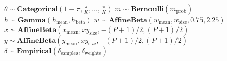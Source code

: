 \begin{algorithmic}[1]
        \State $\theta \sim \mathbf{Categorical}\left(1 - \pi, \frac{\pi}{K}, \dots, \frac{\pi}{K}\right)$
            \State $m \sim \mathbf{Bernoulli}(m_\mathrm{prob})$
            \State $h \sim \mathbf{Gamma}(h_\mathrm{mean}, h_\mathrm{beta})$
            \State $w \sim \mathbf{AffineBeta}(w_\mathrm{mean}, w_\mathrm{size}, 0.75, 2.25)$
            \State $x \sim \mathbf{AffineBeta} \left( x_\mathrm{mean}, xy_\mathrm{size}, -(P+1)/2, (P+1)/2 \right) $
            \State $y \sim \mathbf{AffineBeta} \left( y_\mathrm{mean}, xy_\mathrm{size}, -(P+1)/2, (P+1)/2 \right)$
        \EndFor
            \State $\delta \sim \mathbf{Empirical}( \delta_\mathrm{samples}, \delta_\mathrm{weights})$
        \EndFor
    \EndFor
\EndFor
\end{algorithmic}
